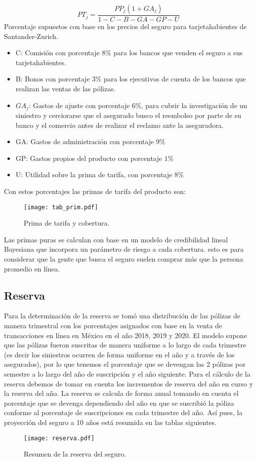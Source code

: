 \documentclass{article}
\begin{document}
\begin{equation*}
    PT_j =  \frac{ PP_j (1 + GA_j ) }{ 
    1 - C - B - GA - GP - U}
\end{equation*}
Porcentaje supuestos con base en los precios del seguro para tarjetahabientes de Santander-Zurich.
\begin{itemize}
    \item C: Comisión con porcentaje $8\%$ para los bancos que venden el seguro a sus tarjetahabientes. 
    \item B: Bonos con porcentaje $3\%$ para los ejecutivos de cuenta de los bancos que realizan las ventas de las pólizas.
    \item $GA_j$: Gastos de ajuste con porcentaje $6\%$, para cubrir la investigación de un siniestro y cerciorarse que el asegurado busco el reembolso por parte de su banco y el comercio antes de realizar el reclamo ante la aseguradora.
    \item GA: Gastos de administración con porcentaje $9\%$
    \item GP: Gastos propios del producto con porcentaje $1\%$
    \item U: Utilidad sobre la prima de tarifa, con porcentaje $8\%$
\end{itemize}
Con estos porcentajes las primas de tarifa del producto son:
\begin{figure}[H]
    \texttt{[image: tab\_prim.pdf]}
    \caption{Prima de tarifa y cobertura.}
\end{figure}
\newpage

Las primas puras se calculan con base en un modelo de credibilidad lineal Bayesiana que incorpora un parámetro de riesgo a cada cobertura. esto es para considerar que la gente que busca el seguro suelen comprar más que la persona promedio en línea.
\subsection*{Reserva}
Para la determinación de la reserva se tomó una distribución de las pólizas de manera trimestral con los porcentajes asignados con base en la venta de transacciones en línea en México en el año 2018, 2019 y 2020. 
El modelo supone que las pólizas fueron suscritas de manera uniforme a lo largo de cada trimestre (es decir los siniestros ocurren de forma uniforme en el año y a través de los asegurados), por lo que tenemos el porcentaje que se devengan las
2 pólizas por semestre a lo largo del año de suscripción y el año siguiente. Para el cálculo de la reserva debemos de tomar en cuenta los incrementos de reserva del año en curso y la reserva del año.
La reserva se calcula de forma anual tomando en cuenta el porcentaje que se devenga dependiendo del año en que se suscribió la póliza conforme al porcentaje de suscripciones en cada trimestre del año. Así pues, la proyección del seguro a 10 años está resumida en las tablas siguientes.
\begin{figure}[H]
    \centering
    \texttt{[image: reserva.pdf]}
    \caption{Resumen de la reserva del seguro.}
\end{figure}
\newpage
\end{document}
